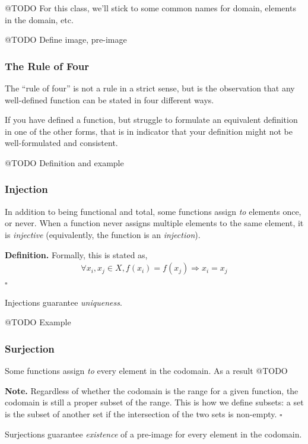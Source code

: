 \documentclass[letterpaper,twoside]{article}
\def\SmallHSpace{\hspace*{1mm}}
\newcommand{\Definition}[1]{%
    \emoji{book} \textbf{Definition.}\SmallHSpace #1 \hfill $\square$
}
\newcommand{\Note}[1]{%
    \emoji{warning} \textbf{Note.}\SmallHSpace #1 \hfill $\square$
}
\begin{document}
\begin{multicols*}{2}
@TODO For this class, we'll stick to some common names for domain, elements in the domain, etc.

@TODO Define image, pre-image

\subsubsection{The Rule of Four}

The ``rule of four'' is not a rule in a strict sense, but is the observation that any well-defined function can be stated in four different ways.

If you have defined a function, but struggle to formulate an equivalent definition in one of the other forms, that is in indicator that your definition might not be well-formulated and consistent.

@TODO Definition and example

\subsubsection{Injection}

In addition to being functional and total, some functions assign \textit{to} elements once, or never.
When a function never assigns multiple elements to the same element, it is \textit{injective} (equivalently, the function is an \textit{injection}).

\Definition
{
    Formally, this is stated as,
    \begin{align}
        \forall x_i, x_j \in X, f(x_i) = f(x_j) \Longrightarrow x_i = x_j
    \end{align}
}

Injections guarantee \textit{uniqueness}.

@TODO Example

\subsubsection{Surjection}

Some functions assign \textit{to} every element in the codomain.
As a result @TODO

\Note
{
    Regardless of whether the codomain is the range for a given function, the codomain is still a proper subset of the range.
    This is how we define subsets: a set is the subset of another set if the intersection of the two sets is non-empty.
}

Surjections guarantee \textit{existence} of a pre-image for every element in the codomain.


\end{multicols*}
\end{document}
